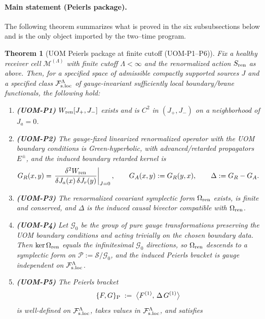 \documentclass[10pt]{article}
\theoremstyle{definition}
\theoremstyle{plain}
\newtheorem{theorem}{Theorem}[section]
\begin{document}
\paragraph{Main statement (Peierls package).}
The following theorem summarizes what is proved in the six subsubsections below and is the only object imported
by the two--time program.

\begin{theorem}[UOM Peierls package at finite cutoff (UOM-P1--P6)]
\label{thm:uom-peierls-package}
Fix a healthy receiver cell $\mathcal M^{(\Lambda)}$ with finite cutoff $\Lambda<\infty$ and the renormalized action
$S_{\rm ren}$ as above.  Then, for a specified space of admissible compactly supported sources $J$ and a specified
class $\mathcal F_{\rm s.loc}^\Lambda$ of gauge-invariant sufficiently local boundary/brane functionals, the following hold:
\begin{enumerate}[label=\textnormal{(\roman*)},leftmargin=2.2em,itemsep=2pt]
\item \textbf{(UOM-P1)} $W_{\rm ren}[J_+,J_-]$ exists and is $C^2$ in $(J_+,J_-)$ on a neighborhood of $J_a=0$.
\item \textbf{(UOM-P2)} The gauge-fixed linearized renormalized operator with the UOM boundary conditions is Green-hyperbolic,
with advanced/retarded propagators $E^\pm$, and the induced boundary retarded kernel is
\[
G_R(x,y)
=\left.\frac{\delta^2 W_{\rm ren}}{\delta J_a(x)\,\delta J_r(y)}\right|_{J=0},
\qquad
G_A(x,y):=G_R(y,x),
\qquad
\Delta:=G_R-G_A.
\]
\item \textbf{(UOM-P3)} The renormalized covariant symplectic form $\Omega_{\rm ren}$ exists, is finite and conserved,
and $\Delta$ is the induced causal bivector compatible with $\Omega_{\rm ren}$.
\item \textbf{(UOM-P4)} Let $\mathcal G_0$ be the group of pure gauge transformations preserving the UOM boundary conditions
and acting trivially on the chosen boundary data.  Then $\ker\Omega_{\rm ren}$ equals the infinitesimal $\mathcal G_0$ directions,
so $\Omega_{\rm ren}$ descends to a symplectic form on $\mathcal P:=\mathcal S/\mathcal G_0$, and the induced Peierls bracket
is gauge independent on $\mathcal F_{\rm s.loc}^\Lambda$.
\item \textbf{(UOM-P5)} The Peierls bracket
\begin{equation}
\{F,G\}_{\rm P}\;:=\;\big\langle F^{(1)},\,\Delta\,G^{(1)}\big\rangle
\label{eq:Peierls-def-summary}
\end{equation}
is well-defined on $\mathcal F_{\rm s.loc}^\Lambda$, takes values in $\mathcal F_{\rm s.loc}^\Lambda$, and satisfies

\end{enumerate}
\end{theorem}
\end{document}
